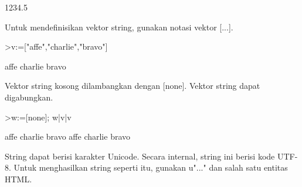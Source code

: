 \documentclass[a4paper,10pt]{article}
\begin{document}
\begin{eulernotebook}
\begin{euleroutput}
  1234.5
\end{euleroutput}
\begin{eulercomment}
Untuk mendefinisikan vektor string, gunakan notasi vektor [...].
\end{eulercomment}
\begin{eulerprompt}
>v:=["affe","charlie","bravo"]
\end{eulerprompt}
\begin{euleroutput}
  affe
  charlie
  bravo
\end{euleroutput}
\begin{eulercomment}
Vektor string kosong dilambangkan dengan [none]. Vektor string dapat
digabungkan.
\end{eulercomment}
\begin{eulerprompt}
>w:=[none]; w|v|v
\end{eulerprompt}
\begin{euleroutput}
  affe
  charlie
  bravo
  affe
  charlie
  bravo
\end{euleroutput}
\begin{eulercomment}
String dapat berisi karakter Unicode. Secara internal, string ini
berisi kode UTF-8. Untuk menghasilkan string seperti itu, gunakan
u"..." dan salah satu entitas HTML.


\end{eulercomment}
\end{eulernotebook}
\end{document}
